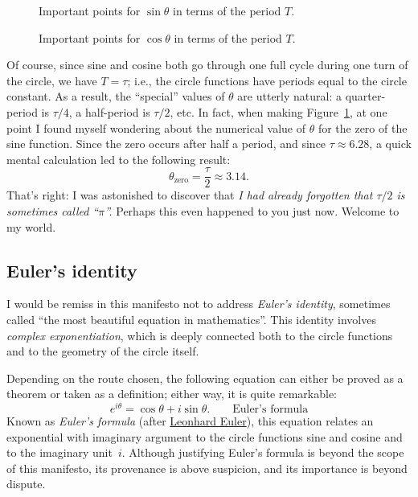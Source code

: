 \begin{figure}
\begin{center}
\end{center}
\caption{Important points for $\sin\theta$ in terms of the period $T$.\label{fig:sine_with_tau}}
\end{figure}

\begin{figure}
\begin{center}
\end{center}
\caption{Important points for $\cos\theta$ in terms of the period $T$.\label{fig:cosine_with_tau}}
\end{figure}

Of course, since sine and cosine both go through one full cycle during one turn of the circle, we have $T = \tau$; i.e., the circle functions have periods equal to the circle constant. As a result, the ``special'' values of $\theta$ are utterly natural: a quarter-period is $\tau/4$, a half-period is $\tau/2$, etc. In fact, when making Figure~\ref{fig:sine_with_tau}, at one point I found myself wondering about the numerical value of $\theta$ for the zero of the sine function. Since the zero occurs after half a period, and since $\tau \approx 6.28$, a quick mental calculation led to the following result:
\[
  \theta_\mathrm{zero} = \frac{\tau}{2} \approx 3.14.
\]
 That's right: I was astonished to discover that \emph{I had already forgotten that $\tau/2$ is sometimes called ``$\pi$''.} Perhaps this even happened to you just now. Welcome to my world.



   \subsection{Euler's identity} %
   \label{sec:euler_s_identity}

I would be remiss in this manifesto not to address \emph{Euler's identity}, sometimes called ``the most beautiful equation in mathematics''. This identity involves \emph{complex exponentiation}, which is deeply connected both to the circle functions and to the geometry of the circle itself.

Depending on the route chosen, the following equation can either be proved as a theorem or taken as a definition; either way, it is quite remarkable:
\begin{equation}
\label{eq:eulers_formula}
e^{i\theta} = \cos\theta + i\sin\theta. \qquad\mbox{Euler's formula}
\end{equation}
Known as \emph{Euler's formula} (after \href{https://en.wikipedia.org/wiki/Leonhard_Euler}{Leonhard Euler}), this equation relates an exponential with imaginary argument to the circle functions sine and cosine and to the imaginary unit~$i$. Although justifying Euler's formula is beyond the scope of this manifesto, its provenance is above suspicion, and its importance is beyond dispute.

